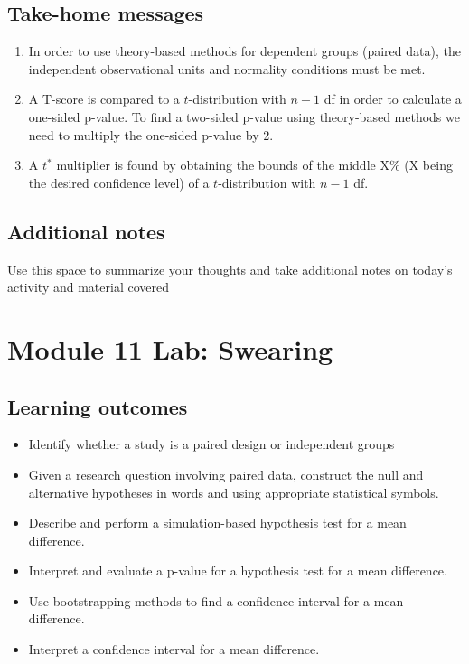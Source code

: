 \documentclass[
]{report}
\begin{document}
\subsection{Take-home messages}\label{take-home-messages-2}

\begin{enumerate}
\def\labelenumi{\arabic{enumi}.}
\item
  In order to use theory-based methods for dependent groups (paired data), the independent observational units and normality conditions must be met.
\item
  A T-score is compared to a \(t\)-distribution with \(n - 1\) df in order to calculate a one-sided p-value. To find a two-sided p-value using theory-based methods we need to multiply the one-sided p-value by 2.
\item
  A \(t^*\) multiplier is found by obtaining the bounds of the middle X\% (X being the desired confidence level) of a \(t\)-distribution with \(n - 1\) df.
\end{enumerate}

\subsection{Additional notes}\label{additional-notes-2}

Use this space to summarize your thoughts and take additional notes on today's activity and material covered

\newpage

\section{Module 11 Lab: Swearing}\label{module-11-lab-swearing}


\subsection{Learning outcomes}\label{learning-outcomes-3}

\begin{itemize}
\item
  Identify whether a study is a paired design or independent groups
\item
  Given a research question involving paired data, construct the null and alternative hypotheses
  in words and using appropriate statistical symbols.
\item
  Describe and perform a simulation-based hypothesis test for a mean difference.
\item
  Interpret and evaluate a p-value for a hypothesis test for a mean difference.
\item
  Use bootstrapping methods to find a confidence interval for a mean difference.
\item
  Interpret a confidence interval for a mean difference.
\end{itemize}
\end{document}
